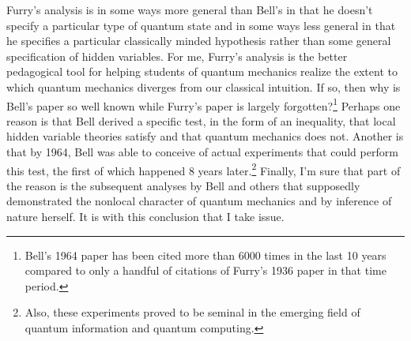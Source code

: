 \documentclass[12pt]{article}
\begin{document}
Furry's analysis is in some ways more general than Bell's in that he doesn't specify a particular type of quantum state and in some ways less general in that he specifies a particular classically minded hypothesis rather than some general specification of hidden variables.  For me, Furry's analysis is the better pedagogical tool for helping students of quantum mechanics realize the extent to which quantum mechanics diverges from our classical intuition.  If so, then why is Bell's paper so well known while Furry's paper is largely forgotten?\footnote{Bell's 1964 paper has been cited more than 6000 times in the last 10 years compared to only a handful of citations of Furry's 1936 paper in that time period.}   Perhaps one reason is that Bell derived a specific test, in the form of an inequality, that local hidden variable theories satisfy and that quantum mechanics does not.   Another is that by 1964, Bell was able to conceive of actual experiments that could perform this test, the first of which happened 8 years later.\footnote{Also, these experiments proved to be seminal in the emerging field of quantum information and quantum computing.}   Finally, I'm sure that part of the reason is the subsequent analyses by Bell and others that supposedly demonstrated the nonlocal character of quantum mechanics and by inference of nature herself.  It is with this conclusion that I take issue.
    
\end{document}
